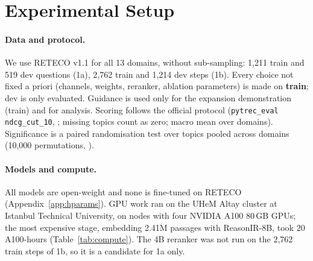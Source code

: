 \section{Experimental Setup}
\label{sec:setup}

\paragraph{Data and protocol.} We use RETECO v1.1 for all 13 domains, without sub-sampling:
1{,}211 train and 519 dev questions (1a), 2{,}762 train and 1{,}214 dev steps (1b). Every choice
not fixed a priori (channels, weights, reranker, ablation parameters) is made on \textbf{train};
dev is only evaluated. Guidance is used only for the expansion demonstration (train) and for
analysis. Scoring follows the official protocol (\texttt{pytrec\_eval} \texttt{ndcg\_cut\_10},
\citealp{vangysel2018pytreceval}; missing topics count as zero; macro mean over domains).
Significance is a paired randomisation test over topics pooled across domains (10{,}000
permutations, \citealp{smucker2007significance}).

\paragraph{Models and compute.} All models are open-weight and none is fine-tuned on RETECO
(Appendix~\ref{app:hparams}). GPU work ran on the UHeM Altay cluster at Istanbul Technical
University, on nodes with four NVIDIA A100 80\,GB GPUs; the most expensive stage, embedding
2.41M passages with ReasonIR-8B, took 20 A100-hours (Table~\ref{tab:compute}). The 4B reranker
was not run on the 2{,}762 train steps of 1b, so it is a candidate for 1a only.
